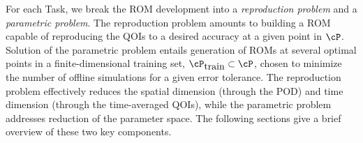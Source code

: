 For each Task, we break the ROM development into a {\em reproduction problem}
and a {\em parametric problem}.
  The reproduction problem amounts to building a ROM capable of reproducing
the QOIs to a desired accuracy at a given point in $\cP$.
  Solution of the parametric problem entails generation of ROMs at several
optimal points in a finite-dimensional training set, $\cP_{\mbox{train}}
\subset \cP$, chosen to minimize the number of offline simulations for a given
error tolerance.
  The reproduction problem effectively reduces the spatial dimension (through
the POD) and time dimension (through the time-averaged QOIs), while the
parametric problem addresses reduction of the parameter space.
The following sections give a brief overview of these two key components.


